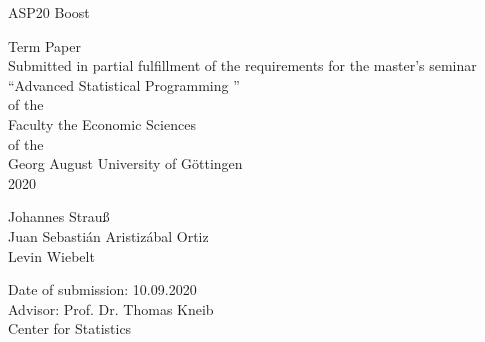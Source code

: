 \begin{titlepage}
\vspace*{3.5cm}
\centering
{\LARGE ASP20 Boost}\\[2\baselineskip]
{\LARGE  Term Paper  \\
 Submitted in partial fulfillment of the requirements for the  master's seminar\\
\textquotedblleft Advanced Statistical Programming \textquotedblright\ \\
of the \\
Faculty the Economic Sciences \\
of the \\
Georg August University of Göttingen\\
2020 \par}
\vspace*{\fill}
\begin{flushleft}
Johannes Strauß\\
Juan Sebastián Aristizábal Ortiz\\
Levin Wiebelt

Date of submission: 10.09.2020\\
\vspace{10mm}
Advisor: Prof. Dr. Thomas Kneib\\
Center for Statistics\\
\end{flushleft}
\thispagestyle{empty}
\end{titlepage}
